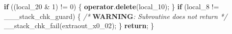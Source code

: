 \documentclass[
]{article}
\newenvironment{Shaded}{}{}
\newcommand{\AlertTok}[1]{\textcolor[rgb]{1.00,0.00,0.00}{\textbf{#1}}}
\newcommand{\CommentTok}[1]{\textcolor[rgb]{0.38,0.63,0.69}{\textit{#1}}}
\newcommand{\ControlFlowTok}[1]{\textcolor[rgb]{0.00,0.44,0.13}{\textbf{#1}}}
\newcommand{\DecValTok}[1]{\textcolor[rgb]{0.25,0.63,0.44}{#1}}
\newcommand{\KeywordTok}[1]{\textcolor[rgb]{0.00,0.44,0.13}{\textbf{#1}}}
\newcommand{\NormalTok}[1]{#1}
\newcommand{\OperatorTok}[1]{\textcolor[rgb]{0.40,0.40,0.40}{#1}}
\begin{document}
\begin{Shaded}
\begin{Highlighting}[]
  \ControlFlowTok{if} \OperatorTok{((}\NormalTok{local\_20 }\OperatorTok{\&} \DecValTok{1}\OperatorTok{)} \OperatorTok{!=} \DecValTok{0}\OperatorTok{)} \OperatorTok{\{}
    \KeywordTok{operator}\OperatorTok{.}\KeywordTok{delete}\OperatorTok{(}\NormalTok{local\_10}\OperatorTok{);}
  \OperatorTok{\}}
  \ControlFlowTok{if} \OperatorTok{(}\NormalTok{local\_8 }\OperatorTok{!=}\NormalTok{ \_\_\_stack\_chk\_guard}\OperatorTok{)} \OperatorTok{\{}
                    \CommentTok{/* }\AlertTok{WARNING}\CommentTok{: Subroutine does not return */}
\NormalTok{    \_\_stack\_chk\_fail}\OperatorTok{(}\NormalTok{extraout\_x0\_02}\OperatorTok{);}
  \OperatorTok{\}}
  \ControlFlowTok{return}\OperatorTok{;}
\OperatorTok{\}}
\end{Highlighting}
\end{Shaded}
\end{document}
